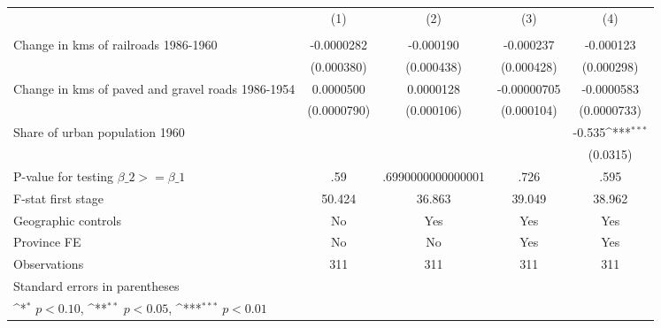 {
\def\sym#1{\ifmmode^{#1}\else\(^{#1}\)\fi}
\begin{tabular}{l*{4}{c}}
\hline\hline
                &\multicolumn{1}{c}{(1)}&\multicolumn{1}{c}{(2)}&\multicolumn{1}{c}{(3)}&\multicolumn{1}{c}{(4)}\\
                &\multicolumn{1}{c}{}&\multicolumn{1}{c}{}&\multicolumn{1}{c}{}&\multicolumn{1}{c}{}\\
\hline
Change in kms of railroads 1986-1960&-0.0000282         &-0.000190         &-0.000237         &-0.000123         \\
                &(0.000380)         &(0.000438)         &(0.000428)         &(0.000298)         \\
[1em]
Change in kms of paved and gravel roads 1986-1954&0.0000500         &0.0000128         &-0.00000705         &-0.0000583         \\
                &(0.0000790)         &(0.000106)         &(0.000104)         &(0.0000733)         \\
[1em]
Share of urban population 1960&                  &                  &                  &   -0.535\sym{***}\\
                &                  &                  &                  & (0.0315)         \\
\hline
P-value for testing $\beta\_{2} >= \beta\_{1}$&      .59         &.6990000000000001         &     .726         &     .595         \\
F-stat first stage&   50.424         &   36.863         &   39.049         &   38.962         \\
Geographic controls&       No         &      Yes         &      Yes         &      Yes         \\
Province FE     &       No         &       No         &      Yes         &      Yes         \\
Observations    &      311         &      311         &      311         &      311         \\
\hline\hline
\multicolumn{5}{l}{\footnotesize Standard errors in parentheses}\\
\multicolumn{5}{l}{\footnotesize \sym{*} \(p<0.10\), \sym{**} \(p<0.05\), \sym{***} \(p<0.01\)}\\
\end{tabular}
}
